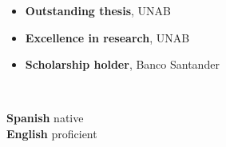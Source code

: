 \documentclass[9pt]{developercv}
\begin{document}
	\begin{minipage}{0.4\textwidth}
		
		\begin{itemize}[noitemsep,nolistsep,leftmargin=*]
			\item \textbf{Outstanding thesis}, UNAB
			\item \textbf{Excellence in research}, UNAB
			\item \textbf{Scholarship holder}, Banco Santander
		\end{itemize}
	\end{minipage}
	\begin{minipage}{0.3\textwidth}
		
		\\
	\end{minipage}
	\begin{minipage}{0.3\textwidth}
		
		\textbf{Spanish} native\\
		\textbf{English} proficient
	\end{minipage}
	
\end{document}
